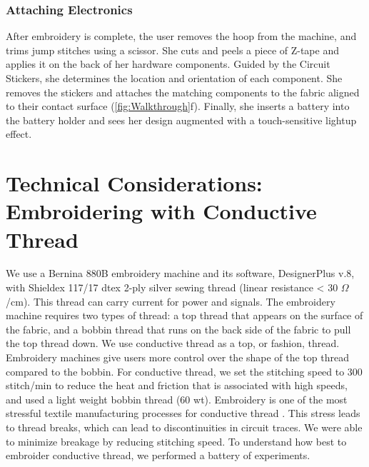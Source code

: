 \documentclass[header.tex]{subfiles}
\begin{document}

\subsubsection{Attaching Electronics}
After embroidery is complete, the user removes the hoop from the machine, and trims jump stitches using a scissor. She cuts and peels a piece of Z-tape and applies it on the back of her hardware components. Guided by the Circuit Stickers, she determines the location and orientation of each component. She removes the stickers and attaches the matching components to the fabric aligned to their contact surface (\ref{fig:Walkthrough}f). Finally, she inserts a battery into the battery holder and sees her design augmented with a touch-sensitive lightup effect.











\section{Technical Considerations: Embroidering with Conductive Thread}

We use a Bernina 880B
embroidery machine and its software, DesignerPlus v.8, with Shieldex 117/17 dtex 2-ply silver sewing thread (linear resistance < 30 $\Omega$/cm). 
This thread can carry current for power and signals. The embroidery machine requires two types of thread: a top thread that appears on the surface of the fabric, and a bobbin thread that runs on the back side of the fabric to pull the top thread down. We use conductive thread as a top, or fashion, thread. Embroidery machines give users more control over the shape of the top thread compared to the bobbin. For conductive thread, we set the stitching speed to 300 stitch/min to reduce the heat and friction that is associated with high speeds, and used a light weight bobbin thread (60 wt). Embroidery is one of the most stressful textile manufacturing processes for conductive thread \cite{5387040}. This stress leads to thread breaks, which can lead to discontinuities in circuit traces. We were able to minimize breakage by reducing stitching speed. To understand how best to embroider conductive thread, we performed a battery of experiments.
\end{document}
